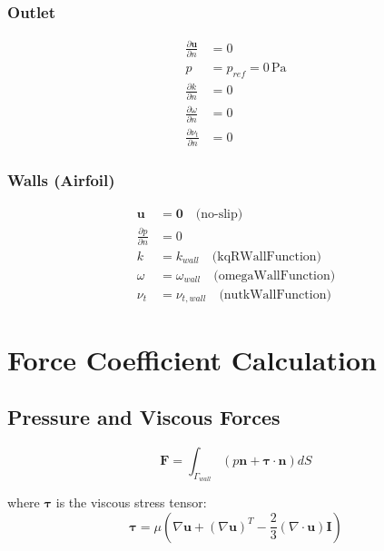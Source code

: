 \documentclass{article}
\begin{document}
\subsubsection{Outlet}
\begin{align}
\frac{\partial \mathbf{u}}{\partial n} &= 0 \\
p &= p_{ref} = 0 \, \text{Pa} \\
\frac{\partial k}{\partial n} &= 0 \\
\frac{\partial \omega}{\partial n} &= 0 \\
\frac{\partial \nu_t}{\partial n} &= 0
\end{align}

\subsubsection{Walls (Airfoil)}
\begin{align}
\mathbf{u} &= \mathbf{0} \quad \text{(no-slip)} \\
\frac{\partial p}{\partial n} &= 0 \\
k &= k_{wall} \quad \text{(kqRWallFunction)} \\
\omega &= \omega_{wall} \quad \text{(omegaWallFunction)} \\
\nu_t &= \nu_{t,wall} \quad \text{(nutkWallFunction)}
\end{align}

\section{Force Coefficient Calculation}

\subsection{Pressure and Viscous Forces}
\begin{equation}
\mathbf{F} = \int_{\Gamma_{wall}} \left(p \mathbf{n} + \boldsymbol{\tau} \cdot \mathbf{n}\right) dS
\end{equation}

where $\boldsymbol{\tau}$ is the viscous stress tensor:
\begin{equation}
\boldsymbol{\tau} = \mu \left(\nabla \mathbf{u} + (\nabla \mathbf{u})^T - \frac{2}{3}(\nabla \cdot \mathbf{u})\mathbf{I}\right)
\end{equation}
\end{document}
